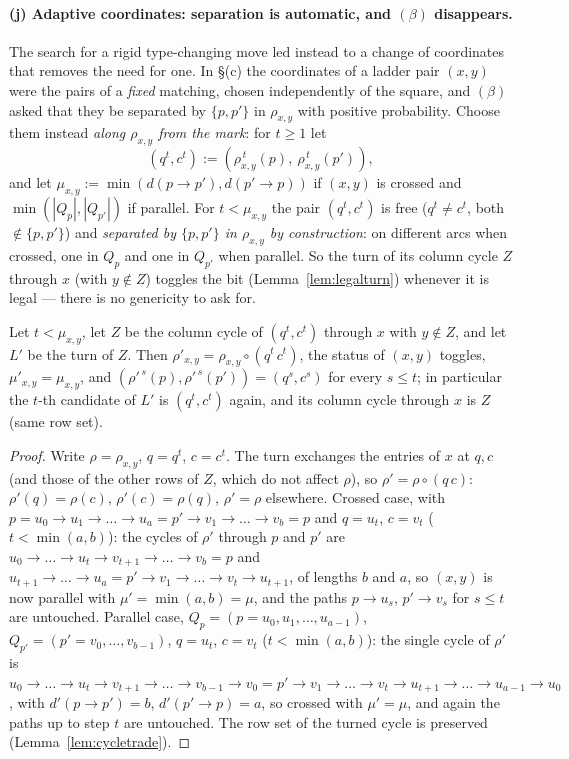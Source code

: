\paragraph{(j) Adaptive coordinates: separation is automatic, and
$(\beta)$ disappears.}  The search for a rigid type-changing move
led instead to a change of coordinates that removes the need for one.
In \S(c) the coordinates of a ladder pair $(x,y)$ were the pairs of a
\emph{fixed} matching, chosen independently of the square, and
$(\beta)$ asked that they be separated by $\{p,p'\}$ in $\rho_{x,y}$
with positive probability.  Choose them instead \emph{along
$\rho_{x,y}$ from the mark}: for $t\ge1$ let
\[
(q^t,c^t):=(\rho_{x,y}^{\,t}(p),\ \rho_{x,y}^{\,t}(p')),
\]
and let $\mu_{x,y}:=\min(d(p\to p'),d(p'\to p))$ if $(x,y)$ is crossed
and $\min(|Q_p|,|Q_{p'}|)$ if parallel.  For $t<\mu_{x,y}$ the pair
$(q^t,c^t)$ is free ($q^t\ne c^t$, both $\notin\{p,p'\}$) and
\emph{separated by $\{p,p'\}$ in $\rho_{x,y}$ by construction}: on
different arcs when crossed, one in $Q_p$ and one in $Q_{p'}$ when
parallel.  So the turn of its column cycle $Z$ through $x$ (with $y\notin Z$)
toggles the bit (Lemma~\ref{lem:legalturn}) whenever it is legal ---
there is no genericity to ask for.

\begin{lemma}\label{lem:adaptinv}
Let $t<\mu_{x,y}$, let $Z$ be the column cycle of $(q^t,c^t)$ through
$x$ with $y\notin Z$, and let $L'$ be the turn of $Z$.  Then
$\rho'_{x,y}=\rho_{x,y}\circ(q^t\,c^t)$, the status of $(x,y)$ toggles,
$\mu'_{x,y}=\mu_{x,y}$, and $(\rho'^{\,s}(p),\rho'^{\,s}(p'))=(q^s,c^s)$
for every $s\le t$; in particular the $t$-th candidate of $L'$ is
$(q^t,c^t)$ again, and its column cycle through $x$ is $Z$ (same row
set).
\end{lemma}
\begin{proof}
Write $\rho=\rho_{x,y}$, $q=q^t$, $c=c^t$.  The turn exchanges the
entries of $x$ at $q,c$ (and those of the other rows of $Z$, which do
not affect $\rho$), so $\rho'=\rho\circ(q\,c)$: $\rho'(q)=\rho(c)$,
$\rho'(c)=\rho(q)$, $\rho'=\rho$ elsewhere.  Crossed case, with
$p=u_0\to u_1\to\dots\to u_a=p'\to v_1\to\dots\to v_b=p$ and
$q=u_t$, $c=v_t$ ($t<\min(a,b)$): the cycles of $\rho'$ through $p$
and $p'$ are $u_0\to\dots\to u_t\to v_{t+1}\to\dots\to v_b=p$ and
$u_{t+1}\to\dots\to u_a=p'\to v_1\to\dots\to v_t\to u_{t+1}$, of
lengths $b$ and $a$, so $(x,y)$ is now parallel with
$\mu'=\min(a,b)=\mu$, and the paths $p\to u_s$, $p'\to v_s$ for
$s\le t$ are untouched.  Parallel case, $Q_p=(p=u_0,u_1,\dots,u_{a-1})$,
$Q_{p'}=(p'=v_0,\dots,v_{b-1})$, $q=u_t$, $c=v_t$ ($t<\min(a,b)$): the
single cycle of $\rho'$ is
$u_0\to\dots\to u_t\to v_{t+1}\to\dots\to v_{b-1}\to v_0=p'\to v_1\to\dots\to v_t\to u_{t+1}\to\dots\to u_{a-1}\to u_0$,
with $d'(p\to p')=b$, $d'(p'\to p)=a$, so crossed with $\mu'=\mu$, and
again the paths up to step $t$ are untouched.  The row set of the
turned cycle is preserved (Lemma~\ref{lem:cycletrade}).
\end{proof}

